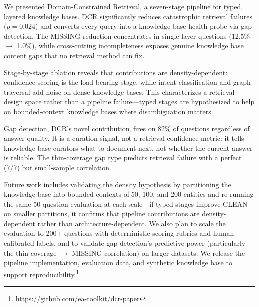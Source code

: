 \documentclass[11pt,a4paper]{article}
\begin{document}
We presented Domain-Constrained Retrieval, a seven-stage pipeline for typed, layered knowledge bases. DCR significantly reduces catastrophic retrieval failures ($p = 0.024$) and converts every query into a knowledge base health probe via gap detection. The MISSING reduction concentrates in single-layer questions (12.5\% $\to$ 1.0\%), while cross-cutting incompleteness exposes genuine knowledge base content gaps that no retrieval method can fix.

Stage-by-stage ablation reveals that contributions are density-dependent: confidence scoring is the load-bearing stage, while intent classification and graph traversal add noise on dense knowledge bases. This characterizes a retrieval design space rather than a pipeline failure---typed stages are hypothesized to help on bounded-context knowledge bases where disambiguation matters.

Gap detection, DCR's novel contribution, fires on 82\% of questions regardless of answer quality. It is a curation signal, not a retrieval confidence metric: it tells knowledge base curators what to document next, not whether the current answer is reliable. The thin-coverage gap type predicts retrieval failure with a perfect (7/7) but small-sample correlation.

Future work includes validating the density hypothesis by partitioning the knowledge base into bounded contexts of 50, 100, and 200 entities and re-running the same 50-question evaluation at each scale---if typed stages improve CLEAN on smaller partitions, it confirms that pipeline contributions are density-dependent rather than architecture-dependent. We also plan to scale the evaluation to 200+ questions with deterministic scoring rubrics and human-calibrated labels, and to validate gap detection's predictive power (particularly the thin-coverage $\to$ MISSING correlation) on larger datasets. We release the pipeline implementation, evaluation data, and synthetic knowledge base to support reproducibility.\footnote{\url{https://github.com/ea-toolkit/dcr-paper}}


\end{document}
